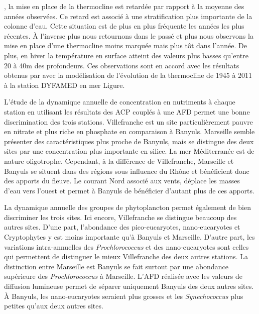\documentclass[12pt]{article}
\begin{document}
, la mise en place de la thermocline est retardée par rapport à la moyenne des années observées. Ce retard est associé à une stratification plus importante de la colonne d’eau. Cette situation est de plus en plus fréquente les années les plus récentes. À l’inverse plus nous retournons dans le passé et plus nous observons la mise en place d’une thermocline moins marquée mais plus tôt dans l’année. De plus, en hiver la température en surface atteint des valeurs plus basses qu’entre 20 à 40m des profondeurs. Ces observations sont en accord avec les résultats obtenus par \citet{Rivetti2017} avec la modélisation de l’évolution de la thermocline de 1945 à 2011 à la station DYFAMED en mer Ligure.  

L’étude de la dynamique annuelle de concentration en nutriments à chaque station en utilisant les résultats des ACP couplés à une AFD permet une bonne discrimination des trois stations. Villefranche est un site particulièrement pauvre en nitrate et plus riche en phosphate en comparaison à Banyuls. Marseille semble présenter des caractéristiques plus proche de Banyuls, mais se distingue des deux sites par une concentration plus importante en silice. La mer Méditerranée est de nature oligotrophe. Cependant, à la différence de Villefranche, Marseille et Banyuls se situent dans des régions sous influence du Rhône et bénéficient donc des apports du fleuve. Le courant Nord associé aux vents, déplace les masses d’eau vers l’ouest \citep{Pairaud2011} et permet à Banyuls de bénéficier d’autant plus de ces apports. 

La dynamique annuelle des groupes de phytoplancton permet également de bien discriminer les trois sites. Ici encore, Villefranche se distingue beaucoup des autres sites. D’une part, l’abondance des pico-eucaryotes, nano-eucaryotes et Cryptophytes y est moins importante qu’à Banyuls et Marseille. D’autre part, les variations intra-annuelles des \textit{Prochlorococcus} et des nano-eucaryotes  sont celles qui permettent de distinguer le mieux Villefranche des deux autres stations.  La distinction entre Marseille est Banyuls se fait surtout par une abondance supérieure des \textit{Prochlorococcus} à Marseille. 
L’AFD réalisée avec les valeurs de diffusion lumineuse permet  de séparer uniquement Banyuls des deux autres sites. À Banyuls, les nano-eucaryotes seraient plus grosses et les \textit{Synechococcus} plus petites qu’aux deux autres sites. 
\end{document}
